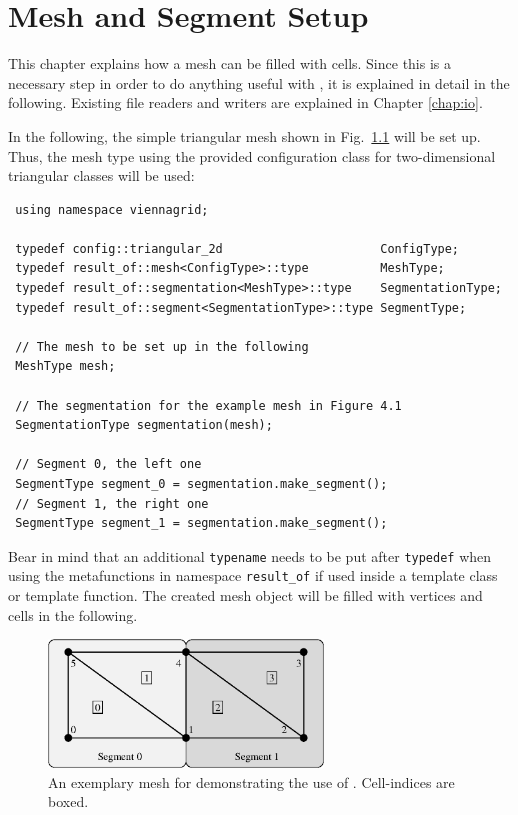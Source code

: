 \chapter{Mesh and Segment Setup} \label{chap:meshsetup}

This chapter explains how a {\ViennaGrid} mesh can be filled with cells. Since this
is a necessary step in order to do anything useful with {\ViennaGrid}, it is explained in detail in the following.
Existing file readers and writers are explained in Chapter \ref{chap:io}.


In the following, the simple triangular mesh shown in Fig.~\ref{fig:samplemesh} will be set up.
Thus, the mesh type using the provided configuration class for two-dimensional triangular classes will be used:
\begin{lstlisting}
 using namespace viennagrid;

 typedef config::triangular_2d                      ConfigType;
 typedef result_of::mesh<ConfigType>::type          MeshType;
 typedef result_of::segmentation<MeshType>::type    SegmentationType;
 typedef result_of::segment<SegmentationType>::type SegmentType;

 // The mesh to be set up in the following
 MeshType mesh;

 // The segmentation for the example mesh in Figure 4.1
 SegmentationType segmentation(mesh);

 // Segment 0, the left one
 SegmentType segment_0 = segmentation.make_segment();
 // Segment 1, the right one
 SegmentType segment_1 = segmentation.make_segment();
\end{lstlisting}
Bear in mind that an additional \lstinline|typename| needs to be put after \lstinline|typedef| when using the metafunctions in namespace \texttt{result\_of} if used inside a template class or template function.
The created mesh object will be filled with vertices and cells in the following.

\begin{figure}[tb]
\centering
 \includegraphics[width=0.65\textwidth]{figures/samplemesh.eps}
 \caption{An exemplary mesh for demonstrating the use of {\ViennaGrid}. Cell-indices are boxed.}
 \label{fig:samplemesh}
\end{figure}

